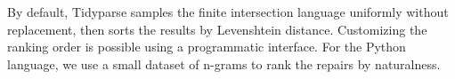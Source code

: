 \documentclass[runningheads]{llncs}
\DeclareRobustCommand{\hlorange}[1]{{\sethlcolor{lorange}\hl{#1}}}
\DeclareRobustCommand{\hlgreen}[1]{{\sethlcolor{lgreen}\hl{#1}}}
\begin{document}
\vspace{-0.2cm}\noindent By default, Tidyparse samples the finite intersection language uniformly without replacement, then sorts the results by Levenshtein distance. Customizing the ranking order is possible using a programmatic interface. For the Python language, we use a small dataset of n-grams to rank the repairs by naturalness.

%
\end{document}
